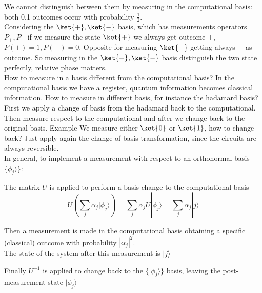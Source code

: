 \documentclass[10pt]{report}
\begin{document}
We cannot distinguish between them by measuring in the computational basis: both 0,1 outcomes occur with probability $\frac{1}{2}$.\\
Considering the $\ket{+},\ket{-}$ basis, which has measurements operators $P_+,P_-$ if we measure the state $\ket{+}$ we always get outcome $+$, $P(+) = 1, P(-) = 0$. Opposite for measuring $\ket{-}$ getting always $-$ as outcome. So measuring in the $\ket{+},\ket{-}$ basis distinguish the two state perfectly, relative phase matters.\\
How to measure in a basis different from the computational basis? In the computational basis we have a register, quantum information becomes classical information. How to measure in different basis, for instance the hadamard basis?\\
First we apply a change of basis from the hadamard back to the computational. Then measure respect to the computational and after we change back to the original basis. Example %
We measure either $\ket{0}$ or $\ket{1}$, how to change back? Just apply again the change of basis transformation, since the circuits are always reversible.\\
In general, to implement a measurement with respect to an orthonormal basis $\{\phi_j\rangle\}$:\begin{list}{}{}
	\item The matrix $U$ is applied to perform a basis change to the computational basis
	$$U\left(\sum_j\alpha_j|\phi_j\rangle\right) = \sum_j\alpha_jU|\phi_j\rangle = \sum_j\alpha_j|j\rangle$$
	\item Then a measurement is made in the computational basis obtaining a specific (classical) outcome with probability $|\alpha_j|^2$.\\
	The state of the system after this measurement is $|j\rangle$
	\item Finally $U^{-1}$ is applied to change back to the $\{|\phi_j\rangle\}$ basis, leaving the post-measurement state $|\phi_j\rangle$
\end{list}
\end{document}
